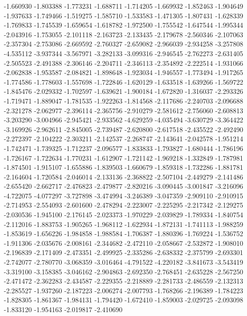 -1.660930
-1.803388
-1.773231
-1.688711
-1.714205
-1.669932
-1.852463
-1.904649
-1.937633
-1.749466
-1.519275
-1.585710
-1.533583
-1.471305
-1.807431
-1.628339
-1.769833
-1.745539
-1.659654
-1.618782
-1.972500
-1.755542
-1.647544
-1.995344
-2.043916
-1.753055
-2.101118
-2.163723
-2.133435
-2.179678
-2.560346
-2.107063
-2.357304
-2.753086
-2.669592
-2.760327
-2.659082
-2.966039
-2.934258
-3.257808
-4.535112
-3.937344
-3.567971
-3.282133
-3.099316
-2.946545
-2.762273
-2.631405
-2.505523
-2.491388
-2.306146
-2.204711
-2.346113
-2.354892
-2.222514
-1.931066
-2.062838
-1.953587
-2.084821
-1.898648
-1.923034
-1.946557
-1.773494
-1.917265
-1.774586
-1.778603
-1.557698
-1.722846
-1.620129
-1.633518
-1.639266
-1.569722
-1.845476
-2.029332
-1.702597
-1.639621
-1.900184
-1.672820
-1.316037
-2.293326
-1.719471
-1.889047
-1.781535
-1.922263
-1.814568
-2.117686
-2.240703
-2.096688
-2.321278
-2.062977
-2.396114
-2.365756
-2.910279
-2.581612
-2.756060
-2.608813
-3.203290
-3.004966
-2.945421
-2.933562
-4.629259
-4.035494
-3.630729
-3.364422
-3.169926
-2.962611
-2.845005
-2.739487
-2.620800
-2.617518
-2.435522
-2.492490
-2.272397
-2.104222
-2.303211
-2.142537
-2.268747
-2.143641
-2.042578
-1.951214
-1.742471
-1.739325
-1.712237
-2.096577
-1.833833
-1.793827
-1.680444
-1.786196
-1.726167
-1.722634
-1.770231
-1.612907
-1.721142
-1.969218
-1.332849
-1.787981
-1.874501
-1.915107
-1.655886
-1.839503
-1.660679
-1.859318
-1.732286
-1.881781
-2.164604
-1.720584
-2.046014
-2.133136
-2.368822
-2.507104
-2.449279
-2.141486
-2.655420
-2.662717
-2.476823
-2.479877
-2.820216
-3.090445
-3.001847
-3.216096
-4.722075
-4.077297
-3.727898
-3.474994
-3.246389
-3.047359
-2.909110
-2.910915
-2.714953
-2.554093
-2.601600
-2.478294
-2.223007
-2.225295
-2.217342
-2.129275
-2.030536
-1.945100
-2.176145
-2.023373
-1.970229
-2.039829
-1.789334
-1.840754
-2.112016
-1.883753
-1.905265
-1.968112
-1.622934
-1.872131
-1.741113
-1.988259
-1.853619
-1.656226
-1.984858
-1.988584
-1.706387
-1.880396
-1.769224
-1.536752
-1.911306
-2.035676
-2.008161
-2.344682
-2.472110
-2.058667
-2.532872
-1.908010
-2.196839
-2.171409
-2.473351
-2.499925
-2.335286
-2.638332
-2.375799
-2.693301
-2.742077
-2.780770
-3.068359
-3.016464
-4.791522
-4.220182
-3.841673
-3.543419
-3.319100
-3.158385
-3.046162
-2.904863
-2.692350
-2.768451
-2.635228
-2.567250
-2.471472
-2.362283
-2.434587
-2.229355
-2.218889
-2.281733
-2.486559
-2.132313
-2.285527
-1.937260
-2.187223
-2.006274
-2.007793
-1.768266
-2.196389
-1.784223
-1.828305
-1.861367
-1.984131
-1.794420
-1.672410
-1.859003
-2.029725
-2.093098
-1.833120
-1.954163
-2.019817
-2.410690
